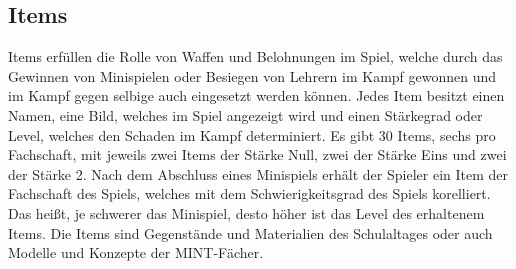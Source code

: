 \subsection{Items}
Items erfüllen die Rolle von Waffen und Belohnungen im Spiel, welche durch das Gewinnen von Minispielen oder Besiegen von Lehrern im Kampf gewonnen und im Kampf gegen selbige auch eingesetzt werden können. Jedes Item besitzt einen Namen, eine Bild, welches im Spiel angezeigt wird und einen Stärkegrad oder Level, welches den Schaden im Kampf determiniert. Es gibt 30 Items, sechs pro Fachschaft, mit jeweils zwei Items der Stärke Null, zwei der Stärke Eins und zwei der Stärke 2. Nach dem Abschluss eines Minispiels erhält der Spieler ein Item der Fachschaft des Spiels, welches mit dem Schwierigkeitsgrad des Spiels korelliert. Das heißt, je schwerer das Minispiel, desto höher ist das Level des erhaltenem Items. Die Items sind Gegenstände und Materialien des Schulaltages oder auch Modelle und Konzepte der MINT-Fächer.
